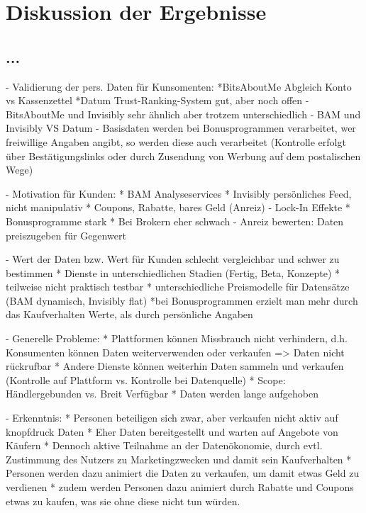 \section{Diskussion der Ergebnisse}

\subsection{...}

- Validierung der pers. Daten für Kunsomenten: 
    *BitsAboutMe Abgleich Konto vs Kassenzettel
    *Datum Trust-Ranking-System gut, aber noch offen
- BitsAboutMe und Invisibly sehr ähnlich aber trotzem unterschiedlich
- BAM und Invisibly VS Datum
- Basisdaten werden bei Bonusprogrammen verarbeitet, wer freiwillige Angaben angibt, so werden diese auch verarbeitet (Kontrolle erfolgt über Bestätigungslinks oder durch Zusendung von Werbung auf dem postalischen Wege)

- Motivation für Kunden:
    * BAM Analyseservices
    * Invisibly persönliches Feed, nicht manipulativ
    * Coupons, Rabatte, bares Geld (Anreiz)
- Lock-In Effekte
    * Bonusprogramme stark
    * Bei Brokern eher schwach
- Anreiz bewerten: Daten preiszugeben für Gegenwert

- Wert der Daten bzw. Wert für Kunden schlecht vergleichbar und schwer zu bestimmen
    * Dienste in unterschiedlichen Stadien (Fertig, Beta, Konzepte)
    * teilweise nicht praktisch testbar
    * unterschiedliche Preismodelle für Datensätze (BAM dynamisch, Invisibly flat)
    *bei Bonusprogrammen erzielt man mehr durch das Kaufverhalten Werte, als durch persönliche Angaben

- Generelle Probleme:
    * Plattformen können Missbrauch nicht verhindern, d.h. Konsumenten können Daten weiterverwenden oder verkaufen => Daten nicht rückrufbar
    * Andere Dienste können weiterhin Daten sammeln und verkaufen (Kontrolle auf Plattform vs. Kontrolle bei Datenquelle)
    * Scope: Händlergebunden vs. Breit Verfügbar
    * Daten werden lange aufgehoben

- Erkenntnis:
    * Personen beteiligen sich zwar, aber verkaufen nicht aktiv auf knopfdruck Daten
    * Eher Daten bereitgestellt und warten auf Angebote von Käufern
    * Dennoch aktive Teilnahme an der Datenökonomie, durch evtl. Zustimmung des Nutzers zu Marketingzwecken und damit sein Kaufverhalten
    * Personen werden dazu animiert die Daten zu verkaufen, um damit etwas Geld zu verdienen
    * zudem werden Personen dazu animiert durch Rabatte und Coupons etwas zu kaufen, was sie ohne diese nicht tun würden.
